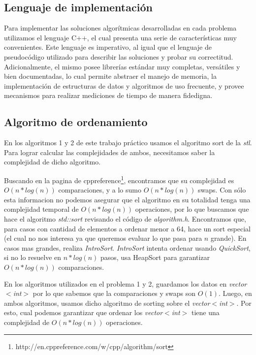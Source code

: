 \subsection{Lenguaje de implementación}

Para implementar las soluciones algorítmicas desarrolladas en cada problema utilizamos el lenguaje C++, el cual presenta una serie de características muy convenientes. Este lenguaje es imperativo, al igual que el lenguaje de pseudocódigo utilizado para describir las soluciones y probar su correctitud. Adicionalmente, el mismo posee librerías estándar muy completas, versátiles y bien documentadas, lo cual permite abstraer el manejo de memoria, la implementación de estructuras de datos y algoritmos de uso frecuente, y provee mecanismos para realizar mediciones de tiempo de manera fidedigna.

\subsection{Algoritmo de ordenamiento}

En los algoritmos 1 y 2 de este trabajo práctico usamos el algoritmo sort de la \emph{stl}. Para lograr calcular las complejidades de ambos, necesitamos saber la complejidad de dicho algoritmo.

Buscando en la pagina de cppreference\footnote{http://en.cppreference.com/w/cpp/algorithm/sort}, encontramos que su complejidad es $O(n*log (n))$  comparaciones, y a lo sumo $O(n*log (n))$ swaps. Con sólo esta informacion no podemos asegurar que el algoritmo en su totalidad tenga una complejidad temporal de $O(n*log (n))$  operaciones, por lo que buscamos que hace el algoritmo \emph{std::sort} revisando el código de \emph{algorithm.h}. Encontramos que, para casos con cantidad de elementos a ordenar menor a 64, hace un sort especial (el cual no nos interesa ya que queremos evaluar lo que pasa para $n$ grande). En casos mas grandes, realiza \emph{IntroSort}. \emph{IntroSort} intenta ordenar usando \emph{QuickSort}, si no lo resuelve en $n*log (n)$ pasos, usa HeapSort para garantizar $O(n*log (n))$ comparaciones.

En los algoritmos utilizados en el problema 1 y 2, guardamos los datos en \emph{vector$<$int$>$} por lo que sabemos que la comparaciones y swaps son $O(1)$. Luego, en ambos algoritmos, usamos dicho algoritmo de sorting sobre el  \emph{vector$<$int$>$}. Por esto, cual podemos garantizar que ordenar los \emph{vector$<$int$>$} tiene una complejidad de $O(n*log (n))$ operaciones.

